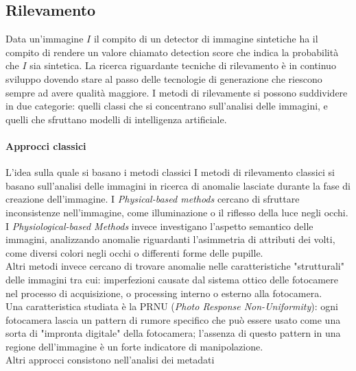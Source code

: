\subsection{Rilevamento}
Data un'immagine $I$ il compito di un detector di immagine sintetiche ha il compito di rendere un valore chiamato detection score che indica la probabilità che $I$ sia sintetica.
La ricerca riguardante tecniche di rilevamento è in continuo sviluppo dovendo stare al passo delle tecnologie di generazione che riescono sempre ad avere qualità maggiore.
I metodi di rilevamente si possono suddividere in due categorie: quelli classi che si concentrano sull'analisi delle immagini, e quelli che sfruttano modelli di intelligenza artificiale.
\paragraph{Approcci classici}
L'idea sulla quale si basano i metodi classici 
I metodi di rilevamento classici si basano sull'analisi delle immagini in ricerca di anomalie lasciate durante la fase di creazione dell'immagine. I \textit{Physical-based methods} cercano di sfruttare inconsistenze nell'immagine, come illuminazione o il riflesso della luce negli occhi. I \textit{Physiological-based Methods} invece investigano l'aspetto semantico delle immagini, analizzando anomalie riguardanti l'asimmetria di attributi dei volti, come diversi colori negli occhi o differenti forme delle pupille.\\

Altri metodi invece cercano di trovare anomalie nelle caratteristiche "strutturali" delle immagini tra cui: imperfezioni causate dal sistema ottico delle fotocamere nel processo di acquisizione, o processing interno o esterno alla fotocamera.\\
 Una caratteristica studiata è la PRNU (\textit{Photo Response Non-Uniformity}): ogni fotocamera lascia un pattern di rumore specifico che può essere usato come una sorta di "impronta digitale" della fotocamera; l'assenza di questo pattern in una regione dell'immagine è un forte indicatore di manipolazione.\\
 Altri approcci consistono nell'analisi dei metadati

